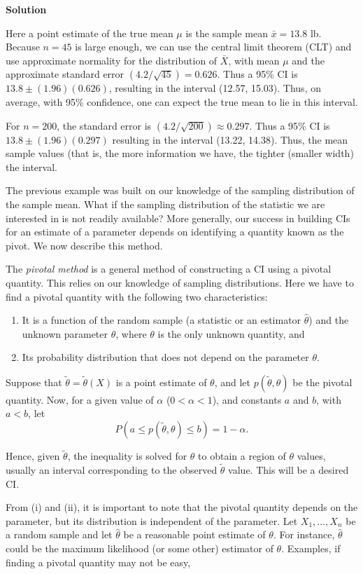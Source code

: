 \textbf{Solution}

Here a point estimate of the true mean $\mu$ is the sample mean $\bar{x} = 13.8$ lb. Because $n = 45$ is large enough, we can use the central limit theorem (CLT) and use approximate normality for the distribution of $\bar{X}$, with mean $\mu$ and the approximate standard error $(4.2/\sqrt{45}) = 0.626$. Thus a 95\% CI is $13.8 \pm (1.96)(0.626)$, resulting in the interval (12.57, 15.03). Thus, on average, with 95\% confidence, one can expect the true mean to lie in this interval.

For $n = 200$, the standard error is $(4.2/\sqrt{200}) \approx 0.297$. Thus a 95\% CI is $13.8 \pm (1.96)(0.297)$ resulting in the interval (13.22, 14.38). Thus, the mean sample values (that is, the more information we have, the tighter (smaller width) the interval.

The previous example was built on our knowledge of the sampling distribution of the sample mean. What if the sampling distribution of the statistic we are interested in is not readily available? More generally, our success in building CIs for an estimate of a parameter depends on identifying a quantity known as the pivot. We now describe this method.

The \textit{pivotal method} is a general method of constructing a CI using a pivotal quantity. This relies on our knowledge of sampling distributions. Here we have to find a pivotal quantity with the following two characteristics:

\begin{enumerate}
\item[(i)] It is a function of the random sample (a statistic or an estimator $\hat{\theta}$) and the unknown parameter $\theta$, where $\theta$ is the only unknown quantity, and
\item[(ii)] Its probability distribution that does not depend on the parameter $\theta$.
\end{enumerate}

Suppose that $\widetilde{\theta} = \widetilde{\theta}(X)$ is a point estimate of $\theta$, and let $p(\widetilde{\theta}, \theta)$ be the pivotal quantity. Now, for a given value of $\alpha$ ($0 < \alpha < 1$), and constants $a$ and $b$, with $a < b$, let
\[
P\left(a \leq p\left(\widetilde{\theta}, \theta\right) \leq b\right) = 1 - \alpha.
\]

Hence, given $\widetilde{\theta}$, the inequality is solved for $\theta$ to obtain a region of $\theta$ values, usually an interval corresponding to the observed $\widetilde{\theta}$ value. This will be a desired CI.

From (i) and (ii), it is important to note that the pivotal quantity depends on the parameter, but its distribution is independent of the parameter. Let $X_1, \ldots, X_n$ be a random sample and let $\widehat{\theta}$ be a reasonable point estimate of $\theta$. For instance, $\widehat{\theta}$ could be the maximum likelihood (or some other) estimator of $\theta$. Examples, if finding a pivotal quantity may not be easy,
